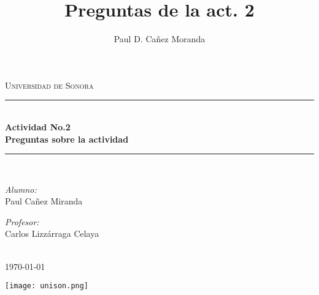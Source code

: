 \documentclass[a4paper]{article}
\title{Preguntas de la act. 2}
\author{Paul D. Cañez Moranda}
\begin{document}
\begin{titlepage}
\newcommand{\HRule}{\rule{\linewidth}{0.5mm}}
\center
\textsc{\LARGE Universidad de Sonora}\\[1cm]
\HRule \\[0.4cm]
{ \huge \bfseries Actividad No.2 }\\[0.4cm]
{ \huge \bfseries Preguntas sobre la actividad }\\[0.4cm]
\HRule \\[1.1cm]
\begin{minipage}{0.4\textwidth}
\begin{flushleft} \large
\emph{Alumno:}\\

Paul Cañez Miranda

\end{flushleft}
\end{minipage}
\begin{minipage}{0.4\textwidth}
\begin{flushright} \large
\emph{Profesor:} \\
Carlos Lizzárraga Celaya 
\end{flushright}
\end{minipage}\\[0.5cm]
{\large \today}\\[1cm] 
\begin{center}
\texttt{[image: unison.png]}
\end{center}
\end{titlepage}
\end{document}
